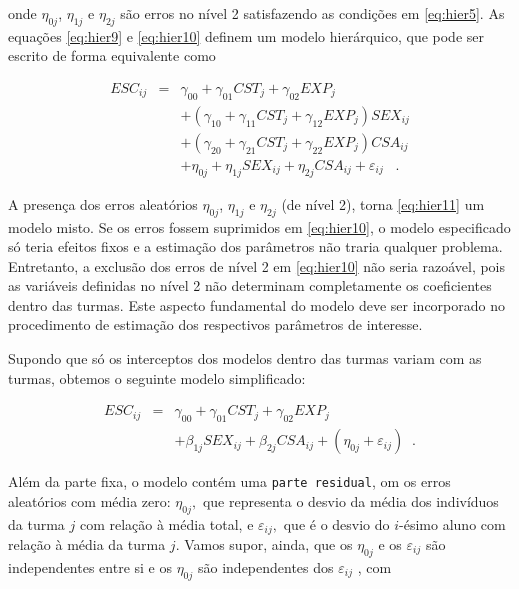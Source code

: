 \documentclass[]{book}
\numberwithin{example}{chapter}
\numberwithin{remark}{chapter}
\numberwithin{definition}{chapter}
\begin{document}
onde \(\eta _{0j}\), \(\eta _{1j}\) e \(\eta _{2j}\) são erros no nível
2 satisfazendo as condições em \eqref{eq:hier5}. As equações
\eqref{eq:hier9} e \eqref{eq:hier10} definem um modelo hierárquico, que pode
ser escrito de forma equivalente como

\begin{eqnarray}
ESC_{ij} &=&\gamma _{00}+\gamma _{01}CST_{j}+\gamma _{02}EXP_{j}
\label{eq:hier11} \\
&&+\left( \gamma _{10}+\gamma _{11}CST_{j}+\gamma _{12}EXP_{j}\right)
SEX_{ij}  \nonumber \\
&&+\left( \gamma _{20}+\gamma _{21}CST_{j}+\gamma _{22}EXP_{j}\right)
CSA_{ij}  \nonumber \\
&&+\eta _{0j}+\eta _{1j}SEX_{ij}+\eta _{2j}CSA_{ij}+\varepsilon _{ij}\;\;\;.
\nonumber
\end{eqnarray}

A presença dos erros aleatórios \(\eta _{0j}\), \(\eta _{1j}\) e
\(\eta _{2j}\) (de nível 2), torna \eqref{eq:hier11} um modelo misto. Se
os erros fossem suprimidos em \eqref{eq:hier10}, o modelo especificado só
teria efeitos fixos e a estimação dos parâmetros não traria qualquer
problema. Entretanto, a exclusão dos erros de nível 2 em \eqref{eq:hier10}
não seria razoável, pois as variáveis definidas no nível 2 não
determinam completamente os coeficientes dentro das turmas. Este aspecto
fundamental do modelo deve ser incorporado no procedimento de estimação
dos respectivos parâmetros de interesse.

Supondo que só os interceptos dos modelos dentro das turmas variam com
as turmas, obtemos o seguinte modelo simplificado:

\begin{eqnarray}
ESC_{ij} &=&\gamma _{00}+\gamma _{01}CST_{j}+\gamma _{02}EXP_{j}
\label{eq:hier12} \\
&&+\beta _{1j}SEX_{ij}+\beta _{2j}CSA_{ij}+\left( \eta _{0j}+\varepsilon
_{ij}\right) \;\;.  \nonumber
\end{eqnarray}

Além da parte fixa, o modelo contém uma \texttt{parte\ residual}, om os
erros aleatórios com média zero: \(\eta _{0j},\) que representa o desvio
da média dos indivíduos da turma \(j\) com relação à média total, e
\(\varepsilon _{ij},\) que é o desvio do \(i\)-ésimo aluno com relação à
média da turma \(j\). Vamos supor, ainda, que os \(\eta _{0j}\) e os
\(\varepsilon _{ij}\) são independentes entre si e os \(\eta _{0j}\) são
independentes dos \(\varepsilon _{ij}\) , com
\end{document}
